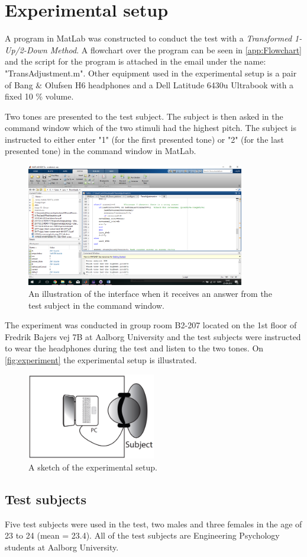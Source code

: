 \section*{Experimental setup}
A program in MatLab was constructed to conduct the test with a \textit{Transformed 1-Up/2-Down Method}. A flowchart over the program can be seen in \autoref{app:Flowchart} and the script for the program is attached in the email under the name: "TransAdjustment.m". Other equipment used in the experimental setup is a pair of Bang $\&$ Olufsen H6 headphones and a Dell Latitude 6430u Ultrabook with a fixed 10 \% volume.

Two tones are presented to the test subject. The subject is then asked in the command window which of the two stimuli had the highest pitch. The subject is instructed to either enter "1" (for the first presented tone) or "2" (for the last presented tone) in the command window in MatLab.\blankline
%
\begin{figure}[H]
\centering
\includegraphics[width = 0.85\textwidth]{Figure/Interface.png} 
\caption{An illustration of the interface when it receives an answer from the test subject in the command window.}
\label{fig:TestInterface}
\end{figure}
\noindent
% 
The experiment was conducted in group room B2-207 located on the 1st floor of Fredrik Bajers vej 7B at Aalborg University and the test subjects were instructed to wear the headphones during the test and listen to the two tones. On \autoref{fig:experiment} the experimental setup is illustrated. 
%
\begin{figure}[H]
\centering
\includegraphics[width = 0.5\textwidth]{Figure/experiment.png} 
\caption{A sketch of the experimental setup.}
\label{fig:experiment}
\end{figure}
%

\subsection*{Test subjects}
%
Five test subjects were used in the test, two males and three females in the age of 23 to 24 (mean = 23.4). All of the test subjects are Engineering Psychology students at Aalborg University. 